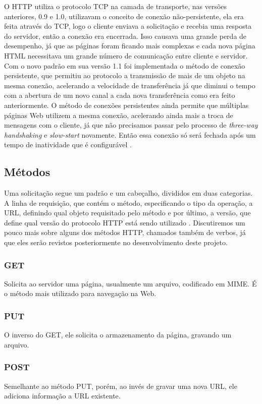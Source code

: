 O HTTP utiliza o protocolo TCP na camada de transporte, nas versões anteriores, 0.9 e 1.0, utilizavam o conceito de conexão não-persistente, ela era feita através do TCP, logo o cliente enviava a solicitação e recebia uma resposta do servidor, então a conexão era encerrada. Isso causava uma grande perda de desempenho, já que as páginas foram ficando mais complexas e cada nova página HTML necessitava um grande número de comunicação entre cliente e servidor. Com o novo padrão em sua versão 1.1 foi implementada o método de conexão persistente, que permitiu ao protocolo a transmissão de mais de um objeto na mesma conexão, acelerando a velocidade de transferência já que diminui o tempo com a abertura de um novo canal a cada nova transferência como era feito anteriormente.
O método de conexões persistentes ainda permite que múltiplas páginas Web utilizem a mesma conexão, acelerando ainda mais a troca de mensagens com o cliente, já que não precisamos passar pelo processo de \textit{three-way handshaking} e \textit{slow-start} novamente. Então essa conexão só será fechada após um tempo de inatividade que é configurável \cite{hirataprotocols}.

\subsection{Métodos}
Uma solicitação segue um padrão e um cabeçalho, divididos em duas categorias. A linha de requisição, que contém o método, especificando o tipo da operação, a URL, definindo qual objeto requisitado pelo método e por último, a versão, que define qual versão do protocolo HTTP está sendo utilizado \cite{tanenbaumredes}. Discutiremos um pouco mais sobre alguns dos métodos HTTP, chamados também de verbos, já que eles serão revistos posteriormente no desenvolvimento deste projeto.

\subsubsection{GET}
Solicita ao servidor uma página, usualmente um arquivo, codificado em MIME. É o método mais utilizado para navegação na Web.

\subsubsection{PUT}

O inverso do GET, ele solicita o armazenamento da página, gravando um arquivo.

\subsubsection{POST}
Semelhante ao método PUT, porém, ao invés de gravar uma nova URL, ele adiciona informação a URL existente.

